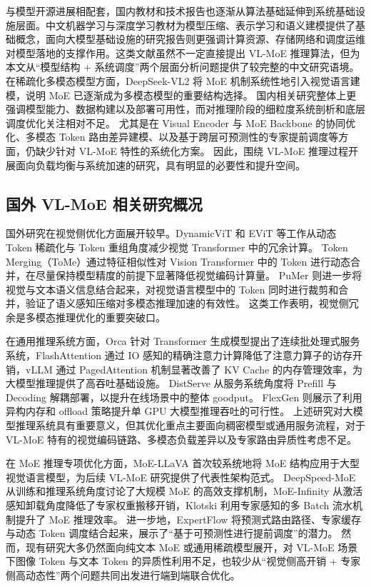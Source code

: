 与模型开源进展相配套，国内教材和技术报告也逐渐从算法基础延伸到系统基础设施层面。中文机器学习与深度学习教材为模型压缩、表示学习和语义建模提供了基础概念\cite{zhou2016machinelearning,qiu2020deeplearning}，面向大模型基础设施的研究报告则更强调计算资源、存储网络和调度运维对模型落地的支撑作用\cite{caict2025llminfra}。这类文献虽然不一定直接提出 VL-MoE 推理算法，但为本文从“模型结构 + 系统调度”两个层面分析问题提供了较完整的中文研究语境。
在稀疏化多模态模型方面，DeepSeek-VL2 将 MoE 机制系统性地引入视觉语言建模，说明 MoE 已逐渐成为多模态模型的重要结构选择\cite{wu2024deepseekvl2}。
国内相关研究整体上更强调模型能力、数据构建以及部署可用性，而对推理阶段的细粒度系统剖析和底层调度优化关注相对不足。
尤其是在 Visual Encoder 与 MoE Backbone 的协同优化、多模态 Token 路由差异建模、以及基于跨层可预测性的专家提前调度等方面，仍缺少针对 VL-MoE 特性的系统化方案。
因此，围绕 VL-MoE 推理过程开展面向负载均衡与系统加速的研究，具有明显的必要性和提升空间。

\subsection{国外 VL-MoE 相关研究概况}
国外研究在视觉侧优化方面展开较早。DynamicViT 和 EViT 等工作从动态 Token 稀疏化与 Token 重组角度减少视觉 Transformer 中的冗余计算\cite{rao2021dynamicvit,liang2022evit}。
Token Merging（ToMe）通过特征相似性对 Vision Transformer 中的 Token 进行动态合并，在尽量保持模型精度的前提下显著降低视觉编码计算量\cite{bolya2023tome}。
PuMer 则进一步将视觉与文本语义信息结合起来，对视觉语言模型中的 Token 同时进行裁剪和合并，验证了语义感知压缩对多模态推理加速的有效性\cite{cao2023pumer}。
这类工作表明，视觉侧冗余是多模态推理优化的重要突破口。

在通用推理系统方面，Orca 针对 Transformer 生成模型提出了连续批处理式服务系统\cite{yu2022orca}，FlashAttention 通过 IO 感知的精确注意力计算降低了注意力算子的访存开销\cite{dao2022flashattention}，vLLM 通过 PagedAttention 机制显著改善了 KV Cache 的内存管理效率，为大模型推理提供了高吞吐基础设施\cite{kwon2023pagedattention}。
DistServe 从服务系统角度将 Prefill 与 Decoding 解耦部署，以提升在线场景中的整体 goodput\cite{zhong2024distserve}。
FlexGen 则展示了利用异构内存和 offload 策略提升单 GPU 大模型推理吞吐的可行性\cite{sheng2023flexgen}。
上述研究对大模型推理系统具有重要意义，但其优化重点主要面向稠密模型或通用服务流程，对于 VL-MoE 特有的视觉编码链路、多模态负载差异以及专家路由异质性考虑不足。

在 MoE 推理专项优化方面，MoE-LLaVA 首次较系统地将 MoE 结构应用于大型视觉语言模型，为后续 VL-MoE 研究提供了代表性架构范式\cite{lin2024moellava}。
DeepSpeed-MoE 从训练和推理系统角度讨论了大规模 MoE 的高效支撑机制\cite{rajbhandari2022deepspeedmoe}，MoE-Infinity 从激活感知卸载角度降低了专家权重搬移开销\cite{xue2024moeinfinity}，Klotski 利用专家感知的多 Batch 流水机制提升了 MoE 推理效率\cite{fang2025klotski}。
进一步地，ExpertFlow 将预测式路由路径、专家缓存与动态 Token 调度结合起来，展示了“基于可预测性进行提前调度”的潜力\cite{he2024expertflow}。
然而，现有研究大多仍然面向纯文本 MoE 或通用稀疏模型展开，对 VL-MoE 场景下图像 Token 与文本 Token 的异质性利用不足，也较少从“视觉侧高开销 + 专家侧高动态性”两个问题共同出发进行端到端联合优化。

